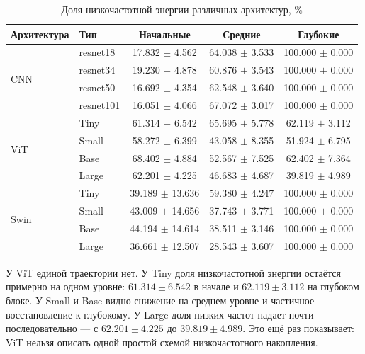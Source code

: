 \begin{table}[h]
\centering
\caption{Доля низкочастотной энергии различных архитектур, \%} 
\label{tab:LowFrac_metrics}
\vspace{1ex} 
\begin{tabular}{llccc}
\toprule
\textbf{Архитектура} & \textbf{Тип} & \textbf{Начальные} & \textbf{Средние} & \textbf{Глубокие} \\
\midrule

\multirow{4}{*}{CNN} & resnet18      & 17.832 $\pm$ 4.562 & 64.038 $\pm$ 3.533 & 100.000 $\pm$ 0.000 \\
                     & resnet34      & 19.230 $\pm$ 4.878 & 60.876 $\pm$ 3.543 & 100.000 $\pm$ 0.000 \\
                     & resnet50      & 16.692 $\pm$ 4.354 & 62.548 $\pm$ 3.640 & 100.000 $\pm$ 0.000 \\
                     & resnet101     & 16.051 $\pm$ 4.066 & 67.072 $\pm$ 3.017 & 100.000 $\pm$ 0.000 \\

\midrule

\multirow{4}{*}{ViT} & Tiny      & 61.314 $\pm$ 6.542 & 65.695 $\pm$ 5.778 & 62.119 $\pm$ 3.112 \\
                     & Small     & 58.272 $\pm$ 6.399 & 43.058 $\pm$ 8.355 & 51.924 $\pm$ 6.795 \\
                     & Base      & 68.402 $\pm$ 4.884 & 52.567 $\pm$ 7.525 & 62.402 $\pm$ 7.364 \\
                     & Large     & 62.201 $\pm$ 4.225 & 46.683 $\pm$ 4.687 & 39.819 $\pm$ 4.989 \\
\midrule

\multirow{4}{*}{Swin} & Tiny       & 39.189 $\pm$ 13.636 & 59.380 $\pm$ 4.247 & 100.000 $\pm$ 0.000 \\
                      & Small      & 43.009 $\pm$ 14.656 & 37.743 $\pm$ 3.771 & 100.000 $\pm$ 0.000 \\
                      & Base       & 44.194 $\pm$ 14.614 & 38.511 $\pm$ 3.146 & 100.000 $\pm$ 0.000 \\
                      & Large      & 36.661 $\pm$ 12.507 & 28.543 $\pm$ 3.607 & 100.000 $\pm$ 0.000 \\
\bottomrule
\end{tabular}
\end{table}

У ViT единой траектории нет. У Tiny доля низкочастотной энергии остаётся примерно на одном уровне: $61.314\pm6.542$ в начале и $62.119\pm3.112$ на глубоком блоке. У Small и Base видно снижение на среднем уровне и частичное восстановление к глубокому. У Large доля низких частот падает почти последовательно — с $62.201\pm4.225$ до $39.819\pm4.989$. Это ещё раз показывает: ViT нельзя описать одной простой схемой низкочастотного накопления.


